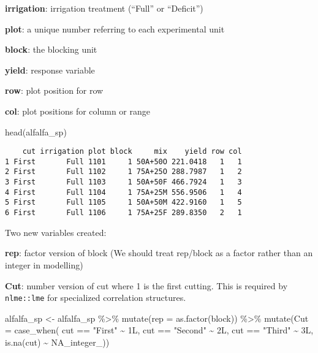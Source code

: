 \documentclass[
  letterpaper,
  DIV=11,
  numbers=noendperiod]{scrreprt}
\newenvironment{Shaded}{\begin{snugshade}}{\end{snugshade}}
\newcommand{\AttributeTok}[1]{\textcolor[rgb]{0.40,0.45,0.13}{#1}}
\newcommand{\ConstantTok}[1]{\textcolor[rgb]{0.56,0.35,0.01}{#1}}
\newcommand{\FunctionTok}[1]{\textcolor[rgb]{0.28,0.35,0.67}{#1}}
\newcommand{\NormalTok}[1]{\textcolor[rgb]{0.00,0.23,0.31}{#1}}
\newcommand{\OtherTok}[1]{\textcolor[rgb]{0.00,0.23,0.31}{#1}}
\newcommand{\SpecialCharTok}[1]{\textcolor[rgb]{0.37,0.37,0.37}{#1}}
\newcommand{\StringTok}[1]{\textcolor[rgb]{0.13,0.47,0.30}{#1}}
\begin{document}
\textbf{irrigation}: irrigation treatment (``Full'' or ``Deficit'')

\textbf{plot}: a unique number referring to each experimental unit

\textbf{block}: the blocking unit

\textbf{yield}: response variable

\textbf{row}: plot position for row

\textbf{col}: plot positions for column or range

\begin{Shaded}
\begin{Highlighting}[]
\FunctionTok{head}\NormalTok{(alfalfa\_sp)}
\end{Highlighting}
\end{Shaded}

\begin{verbatim}
    cut irrigation plot block     mix    yield row col
1 First       Full 1101     1 50A+50O 221.0418   1   1
2 First       Full 1102     1 75A+25O 288.7987   1   2
3 First       Full 1103     1 50A+50F 466.7924   1   3
4 First       Full 1104     1 75A+25M 556.9506   1   4
5 First       Full 1105     1 50A+50M 422.9160   1   5
6 First       Full 1106     1 75A+25F 289.8350   2   1
\end{verbatim}

Two new variables created:

\textbf{rep}: factor version of block (We should treat rep/block as a
factor rather than an integer in modelling)

\textbf{Cut}: number version of cut where 1 is the first cutting. This
is required by \texttt{nlme::lme} for specialized correlation
structures.

\begin{Shaded}
\begin{Highlighting}[]
\NormalTok{alfalfa\_sp }\OtherTok{\textless{}{-}}\NormalTok{ alfalfa\_sp }\SpecialCharTok{\%\textgreater{}\%} 
  \FunctionTok{mutate}\NormalTok{(}\AttributeTok{rep =} \FunctionTok{as.factor}\NormalTok{(block)) }\SpecialCharTok{\%\textgreater{}\%} 
  \FunctionTok{mutate}\NormalTok{(}\AttributeTok{Cut =} \FunctionTok{case\_when}\NormalTok{(}
\NormalTok{    cut }\SpecialCharTok{==} \StringTok{"First"} \SpecialCharTok{\textasciitilde{}}\NormalTok{ 1L,}
\NormalTok{    cut }\SpecialCharTok{==} \StringTok{"Second"} \SpecialCharTok{\textasciitilde{}}\NormalTok{ 2L,}
\NormalTok{    cut }\SpecialCharTok{==} \StringTok{"Third"} \SpecialCharTok{\textasciitilde{}}\NormalTok{ 3L,}
    \FunctionTok{is.na}\NormalTok{(cut) }\SpecialCharTok{\textasciitilde{}} \ConstantTok{NA\_integer\_}\NormalTok{)) }
\end{Highlighting}
\end{Shaded}
\end{document}
